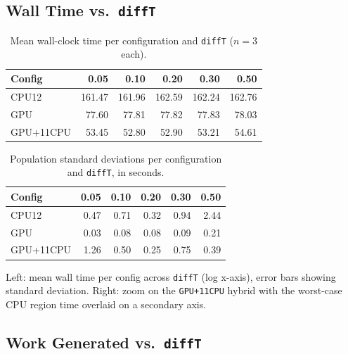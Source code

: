 \documentclass[
	english,
	letterpaper, oneside
]{article}
\begin{document}
\subsection{Wall Time vs.\ \texttt{diffT}}

\begin{table}[H]
    \centering
    \caption{Mean wall-clock time per configuration and \texttt{diffT}
             ($n=3$ each).}
    \label{tab:wall}
    \begin{tabular}{lrrrrr}
        \hline
        Config & 0.05 & 0.10 & 0.20 & 0.30 & 0.50 \\
        \hline
        CPU12     & 161.47 & 161.96 & 162.59 & 162.24 & 162.76 \\
        GPU       & 77.60 & 77.81 & 77.82 & 77.83 & 78.03 \\
        GPU+11CPU & 53.45 & 52.80 & 52.90 & 53.21 & 54.61 \\
        \hline
    \end{tabular}
\end{table}

\begin{table}[H]
    \centering
    \caption{Population standard deviations per configuration and
             \texttt{diffT}, in seconds.}
    \label{tab:std}
    \begin{tabular}{lrrrrr}
        \hline
        Config & 0.05 & 0.10 & 0.20 & 0.30 & 0.50 \\
        \hline
        CPU12     & 0.47 & 0.71 & 0.32 & 0.94 & 2.44 \\
        GPU       & 0.03 & 0.08 & 0.08 & 0.09 & 0.21 \\
        GPU+11CPU & 1.26 & 0.50 & 0.25 & 0.75 & 0.39 \\
        \hline
    \end{tabular}
\end{table}

            {Left: mean wall time per config across \texttt{diffT} (log
             x-axis), error bars showing standard deviation. Right:
             zoom on the \texttt{GPU+11CPU} hybrid with the
             worst-case CPU region time overlaid on a secondary
             axis. \label{fig:sweep}}

\subsection{Work Generated vs.\ \texttt{diffT}}
\end{document}
